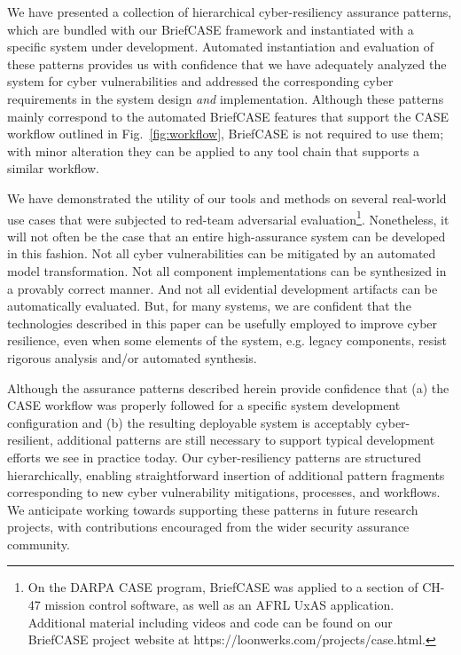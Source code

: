 
We have presented a collection of hierarchical cyber-resiliency assurance patterns, which are bundled with our BriefCASE framework and instantiated with a specific system under development.  Automated instantiation and evaluation of these patterns provides us with confidence that we have adequately analyzed the system for cyber vulnerabilities and addressed the corresponding cyber requirements in the system design \textit{and} implementation.
Although these patterns mainly correspond to the automated BriefCASE features that support the CASE workflow outlined in Fig.~\ref{fig:workflow}, BriefCASE is not required to use them; with minor alteration they can be applied to any tool chain that supports a similar workflow.




We have demonstrated the utility of our tools and methods on several real-world use cases that were subjected to red-team adversarial evaluation\footnote{On the DARPA CASE program, BriefCASE was applied to a section of CH-47 mission control software, as well as an AFRL UxAS application. Additional material including videos and code can be found on our BriefCASE project website at https://loonwerks.com/projects/case.html.}.  Nonetheless, it will not often be the case that an entire high-assurance system can be developed in this fashion.  Not all cyber vulnerabilities can be mitigated by an automated model transformation.  Not all component implementations can be synthesized in a provably correct manner.  And not all evidential development artifacts can be automatically evaluated.  But, for many systems, we are confident that the technologies described in this paper can be usefully employed to improve cyber resilience, even when some elements of the system, e.g. legacy components, resist rigorous analysis and/or automated synthesis.

Although the assurance patterns described herein provide confidence that (a) the CASE workflow was properly followed for a specific system development configuration and (b) the resulting deployable system is acceptably cyber-resilient, additional patterns are still necessary to support typical development efforts we see in practice today.  
%
Our cyber-resiliency patterns are structured hierarchically, enabling straightforward insertion of additional pattern fragments corresponding to new cyber vulnerability mitigations, processes, and workflows. 
We anticipate working towards supporting these patterns in future research projects, with contributions encouraged from the wider security assurance community.